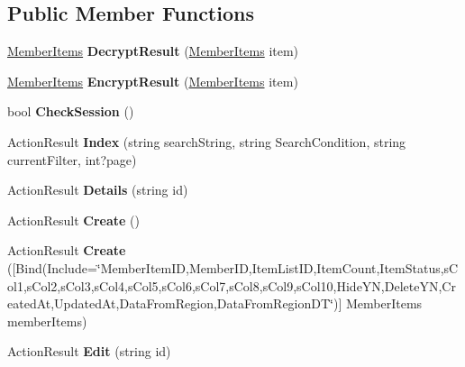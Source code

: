 \subsection*{Public Member Functions}
\begin{DoxyCompactItemize}
\item 
\hyperlink{a00143}{Member\+Items} {\bfseries Decrypt\+Result} (\hyperlink{a00143}{Member\+Items} item)\hypertarget{a00144_abeaf758cc68ebc9b836746c043cd5ddc}{}\label{a00144_abeaf758cc68ebc9b836746c043cd5ddc}

\item 
\hyperlink{a00143}{Member\+Items} {\bfseries Encrypt\+Result} (\hyperlink{a00143}{Member\+Items} item)\hypertarget{a00144_a71fe95f0a6170cd31971802a6cacef29}{}\label{a00144_a71fe95f0a6170cd31971802a6cacef29}

\item 
bool {\bfseries Check\+Session} ()\hypertarget{a00144_a81ca0b39de918ed1582be13bc2dd8af0}{}\label{a00144_a81ca0b39de918ed1582be13bc2dd8af0}

\item 
Action\+Result {\bfseries Index} (string search\+String, string Search\+Condition, string current\+Filter, int?page)\hypertarget{a00144_aed4ecc177fdbd0c82c93914b091dc6e4}{}\label{a00144_aed4ecc177fdbd0c82c93914b091dc6e4}

\item 
Action\+Result {\bfseries Details} (string id)\hypertarget{a00144_aea46203423afddd2bc94ea5d85773463}{}\label{a00144_aea46203423afddd2bc94ea5d85773463}

\item 
Action\+Result {\bfseries Create} ()\hypertarget{a00144_acd9b22be4fd94618a1013d9cec9b536d}{}\label{a00144_acd9b22be4fd94618a1013d9cec9b536d}

\item 
Action\+Result {\bfseries Create} (\mbox{[}Bind(Include=\char`\"{}Member\+Item\+ID,Member\+ID,Item\+List\+ID,Item\+Count,Item\+Status,s\+Col1,s\+Col2,s\+Col3,s\+Col4,s\+Col5,s\+Col6,s\+Col7,s\+Col8,s\+Col9,s\+Col10,Hide\+YN,Delete\+YN,Created\+At,Updated\+At,Data\+From\+Region,Data\+From\+Region\+DT\char`\"{})\mbox{]} Member\+Items member\+Items)\hypertarget{a00144_a3926b1870d671dc5ae1f8080fe95b566}{}\label{a00144_a3926b1870d671dc5ae1f8080fe95b566}

\item 
Action\+Result {\bfseries Edit} (string id)\hypertarget{a00144_a6b36b904da719ef0a29db0248fd1c90b}{}\label{a00144_a6b36b904da719ef0a29db0248fd1c90b}


\end{DoxyCompactItemize}
